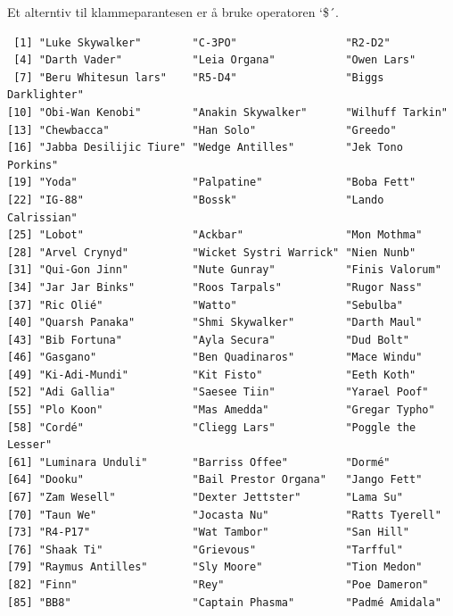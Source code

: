 \documentclass[
  letterpaper,
  DIV=11,
  numbers=noendperiod]{scrreprt}
\newenvironment{Shaded}{\begin{snugshade}}{\end{snugshade}}
\newcommand{\CommentTok}[1]{\textcolor[rgb]{0.37,0.37,0.37}{#1}}
\newcommand{\NormalTok}[1]{\textcolor[rgb]{0.00,0.23,0.31}{#1}}
\newcommand{\SpecialCharTok}[1]{\textcolor[rgb]{0.37,0.37,0.37}{#1}}
\begin{document}
Et alterntiv til klammeparantesen er å bruke operatoren `\$´.

\begin{Shaded}
\end{Shaded}

\begin{verbatim}
 [1] "Luke Skywalker"        "C-3PO"                 "R2-D2"                
 [4] "Darth Vader"           "Leia Organa"           "Owen Lars"            
 [7] "Beru Whitesun lars"    "R5-D4"                 "Biggs Darklighter"    
[10] "Obi-Wan Kenobi"        "Anakin Skywalker"      "Wilhuff Tarkin"       
[13] "Chewbacca"             "Han Solo"              "Greedo"               
[16] "Jabba Desilijic Tiure" "Wedge Antilles"        "Jek Tono Porkins"     
[19] "Yoda"                  "Palpatine"             "Boba Fett"            
[22] "IG-88"                 "Bossk"                 "Lando Calrissian"     
[25] "Lobot"                 "Ackbar"                "Mon Mothma"           
[28] "Arvel Crynyd"          "Wicket Systri Warrick" "Nien Nunb"            
[31] "Qui-Gon Jinn"          "Nute Gunray"           "Finis Valorum"        
[34] "Jar Jar Binks"         "Roos Tarpals"          "Rugor Nass"           
[37] "Ric Olié"              "Watto"                 "Sebulba"              
[40] "Quarsh Panaka"         "Shmi Skywalker"        "Darth Maul"           
[43] "Bib Fortuna"           "Ayla Secura"           "Dud Bolt"             
[46] "Gasgano"               "Ben Quadinaros"        "Mace Windu"           
[49] "Ki-Adi-Mundi"          "Kit Fisto"             "Eeth Koth"            
[52] "Adi Gallia"            "Saesee Tiin"           "Yarael Poof"          
[55] "Plo Koon"              "Mas Amedda"            "Gregar Typho"         
[58] "Cordé"                 "Cliegg Lars"           "Poggle the Lesser"    
[61] "Luminara Unduli"       "Barriss Offee"         "Dormé"                
[64] "Dooku"                 "Bail Prestor Organa"   "Jango Fett"           
[67] "Zam Wesell"            "Dexter Jettster"       "Lama Su"              
[70] "Taun We"               "Jocasta Nu"            "Ratts Tyerell"        
[73] "R4-P17"                "Wat Tambor"            "San Hill"             
[76] "Shaak Ti"              "Grievous"              "Tarfful"              
[79] "Raymus Antilles"       "Sly Moore"             "Tion Medon"           
[82] "Finn"                  "Rey"                   "Poe Dameron"          
[85] "BB8"                   "Captain Phasma"        "Padmé Amidala"        
\end{verbatim}
\end{document}
